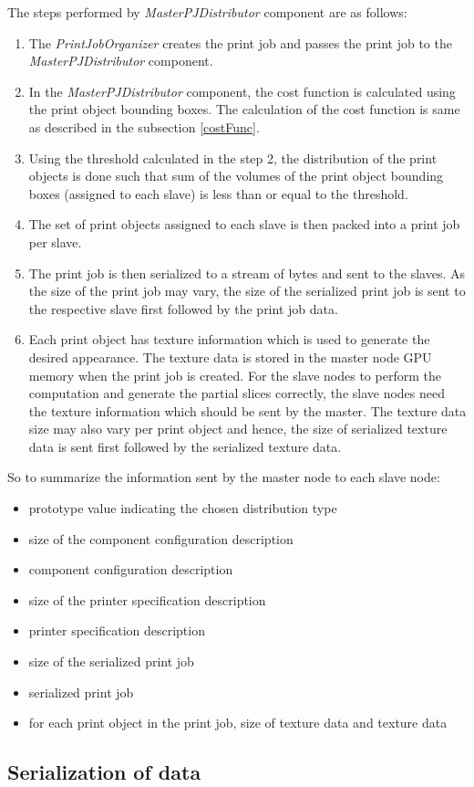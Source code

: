 The steps performed by \textit{MasterPJDistributor} component are as follows: 
\begin{enumerate}
\item The \textit{PrintJobOrganizer} creates the print job and passes the print job to the \textit{MasterPJDistributor} component. 
\item In the \textit{MasterPJDistributor} component, the cost function is calculated using the print object bounding boxes. The calculation of the cost function is same as described in the subsection \ref{costFunc}.
\item Using the threshold calculated in the step 2, the distribution of the print objects is done such that sum of the volumes of the print object bounding boxes (assigned to each slave) is less than or equal to the threshold.
\item The set of print objects assigned to each slave is then packed into a print job per slave. 
\item The print job is then serialized to a stream of bytes and sent to the slaves. As the size of the print job may vary, the size of the serialized print job is sent to the respective slave first followed by the print job data. 
\item Each print object has texture information which is used to generate the desired appearance. The texture data is stored in the master node GPU memory when the print job is created. For the slave nodes to perform the computation and generate the partial slices correctly, the slave nodes need the texture information which should be sent by the master. The texture data size may also vary per print object and hence, the size of serialized texture data is sent first followed by the serialized texture data.   
\end{enumerate}

So to summarize the information sent by the master node to each slave node:
\begin{itemize}
\item prototype value indicating the chosen distribution type
\item size of the component configuration description 
\item component configuration description
\item size of the printer specification description 
\item printer specification description
\item size of the serialized print job 
\item serialized print job 
\item for each print object in the print job, size of texture data and texture data  
\end{itemize}

\subsection{Serialization of data}
